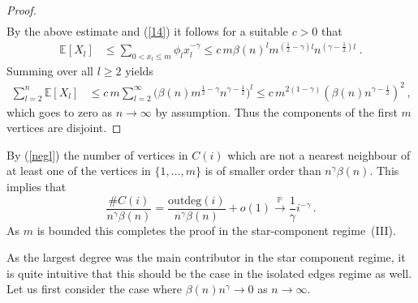 \documentclass[12pt,a4paper]{article}
\numberwithin{equation}{section}
\begin{document}
\begin{proof}
\begin{equation}
\begin{aligned}
    \end{aligned}
\end{equation}
By the above estimate and (\ref{14}) it follows for a suitable  $c>0$ that 
\begin{align*}
      \mathbb{E}[X_l]&\le\sum_{0<x_l\le m} \phi_l x_l^{-\gamma} \le c\,m\beta(n)^{l} m^{(\tfrac12-\gamma)l} n^{(\gamma-\tfrac12)l} \;.
\end{align*}
Summing over all $l\ge2$ yields
\begin{align*}
    \sum_{l=2}^n \mathbb{E}[X_l]&\le c \,m \sum_{l=2}^\infty \Big(\beta(n) m^{\tfrac12-\gamma} n^{\gamma-\tfrac12} \Big)^l 
     \le c\,m^{2(1-\gamma)} (\beta(n) n^{\gamma-\tfrac12})^2\,,
\end{align*}
which goes to zero as $n\to\infty$ by assumption. Thus the components of the first $m$ vertices are disjoint. 
\end{proof}


\noindent By (\ref{negl}) the number of vertices in $C(i)$ which are not a nearest neighbour of at least one of the vertices in $\{1,\dots,m\}$ is of smaller order than $n^\gamma \beta(n)$. This implies that
\begin{equation*}\frac{\#C(i)}{n^\gamma \beta(n)}=\frac{\text{outdeg}(i)}{n^\gamma \beta(n)}+o(1)\overset{\mathbb P}{\longrightarrow} \frac{1}{\gamma}i^{-\gamma}\,. 
\end{equation*}
As $m$ is bounded this completes the proof in the star-component regime~(III).
\medskip


As the largest degree was the main contributor in the star component regime, it is quite intuitive that this should be the case in the  isolated edges regime  as well. 
Let us first consider the case where $\beta(n)n^\gamma \to 0$ as $n\to\infty$.
\end{document}

